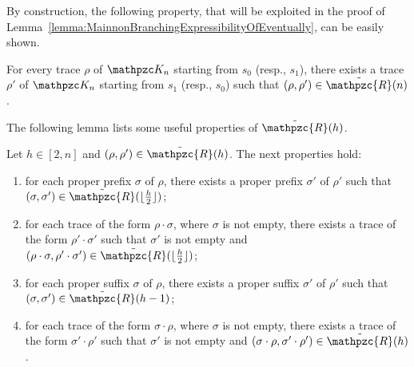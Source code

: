 By construction, the following property, that will be exploited in the proof of Lemma~\ref{lemma:MainnonBranchingExpressibilityOfEventually}, can be easily shown.

\begin{proposition}\label{remark:HcompatibilityTwo} For every trace  $\rho$ of  $\Ku_n$ starting from $s_0$ (resp., $s_1$), there exists a trace $\rho'$ of
$\Ku_n$ starting from $s_1$ (resp., $s_0$) such that $(\rho,\rho')\in \tilde{\mathpzc{R}}(n)$.
\end{proposition}

The following lemma lists some useful properties of $\tilde{\mathpzc{R}}(h)$.

 \begin{lemma}\label{lemma:Hcompatibility} Let $h\in [2,n]$ and $(\rho,\rho')\in \tilde{\mathpzc{R}}(h)$. The next properties hold:
 \begin{enumerate}
  \item for each proper prefix $\sigma$ of $\rho$, there exists a proper prefix $\sigma'$ of $\rho'$ such that $(\sigma,\sigma')\in \tilde{\mathpzc{R}}(\lfloor \frac{h}{2}\rfloor)$;
   \item for each trace of the  form $\rho\cdot \sigma$, where $\sigma$ is not empty, there exists a trace of the form $\rho'\cdot\sigma'$
    such that $\sigma'$ is not empty and $(\rho\cdot\sigma,\rho'\cdot \sigma') \in \tilde{\mathpzc{R}}(\lfloor \frac{h}{2}\rfloor)$;
 \item for each proper suffix $\sigma$ of $\rho$, there exists a proper suffix $\sigma'$ of $\rho'$ such that $(\sigma,\sigma')\in \tilde{\mathpzc{R}}(h-1)$;
   \item for each trace of the form $\sigma \cdot \rho$, where $\sigma$ is not empty, there exists a trace of the form $\sigma'\cdot \rho'$ such that $\sigma'$ is not empty and $(\sigma\cdot \rho,\sigma'\cdot \rho')\in \tilde{\mathpzc{R}}(h)$.
\end{enumerate}
 \end{lemma}
